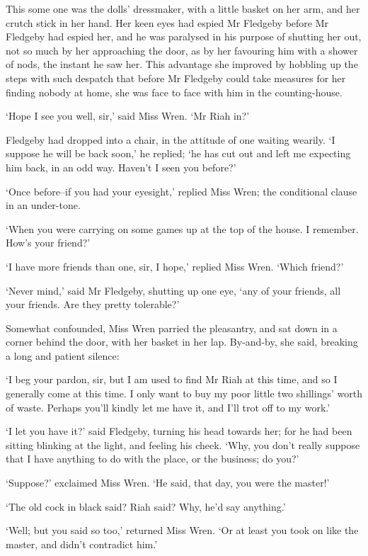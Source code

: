 This some one was the dolls’ dressmaker, with a little basket on her
arm, and her crutch stick in her hand. Her keen eyes had espied Mr
Fledgeby before Mr Fledgeby had espied her, and he was paralysed in his
purpose of shutting her out, not so much by her approaching the door, as
by her favouring him with a shower of nods, the instant he saw her. This
advantage she improved by hobbling up the steps with such despatch that
before Mr Fledgeby could take measures for her finding nobody at home,
she was face to face with him in the counting-house.

‘Hope I see you well, sir,’ said Miss Wren. ‘Mr Riah in?’

Fledgeby had dropped into a chair, in the attitude of one waiting
wearily. ‘I suppose he will be back soon,’ he replied; ‘he has cut
out and left me expecting him back, in an odd way. Haven’t I seen you
before?’

‘Once before--if you had your eyesight,’ replied Miss Wren; the
conditional clause in an under-tone.

‘When you were carrying on some games up at the top of the house. I
remember. How’s your friend?’

‘I have more friends than one, sir, I hope,’ replied Miss Wren. ‘Which
friend?’

‘Never mind,’ said Mr Fledgeby, shutting up one eye, ‘any of your
friends, all your friends. Are they pretty tolerable?’

Somewhat confounded, Miss Wren parried the pleasantry, and sat down in a
corner behind the door, with her basket in her lap. By-and-by, she said,
breaking a long and patient silence:

‘I beg your pardon, sir, but I am used to find Mr Riah at this time, and
so I generally come at this time. I only want to buy my poor little two
shillings’ worth of waste. Perhaps you’ll kindly let me have it, and
I’ll trot off to my work.’

‘I let you have it?’ said Fledgeby, turning his head towards her; for he
had been sitting blinking at the light, and feeling his cheek. ‘Why, you
don’t really suppose that I have anything to do with the place, or the
business; do you?’

‘Suppose?’ exclaimed Miss Wren. ‘He said, that day, you were the
master!’

‘The old cock in black said? Riah said? Why, he’d say anything.’

‘Well; but you said so too,’ returned Miss Wren. ‘Or at least you took
on like the master, and didn’t contradict him.’

